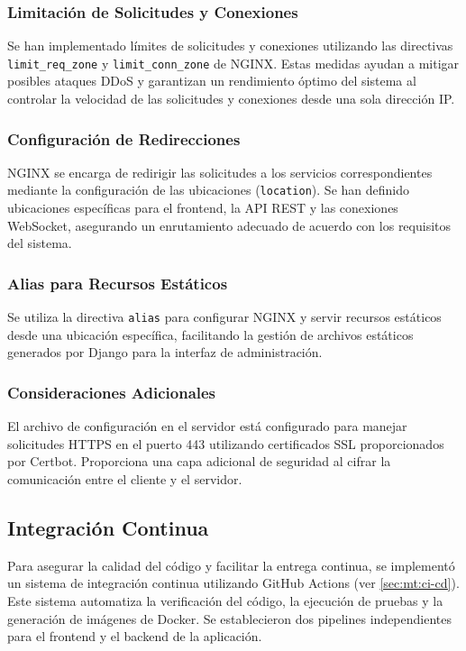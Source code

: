 \subsubsection{Limitación de Solicitudes y Conexiones}

Se han implementado límites de solicitudes y conexiones utilizando las directivas \texttt{limit\_req\_zone} y \texttt{limit\_conn\_zone} de NGINX. Estas medidas ayudan a mitigar posibles ataques DDoS y garantizan un rendimiento óptimo del sistema al controlar la velocidad de las solicitudes y conexiones desde una sola dirección IP.

\subsubsection{Configuración de Redirecciones}

NGINX se encarga de redirigir las solicitudes a los servicios correspondientes mediante la configuración de las ubicaciones (\texttt{location}). Se han definido ubicaciones específicas para el frontend, la API REST y las conexiones WebSocket, asegurando un enrutamiento adecuado de acuerdo con los requisitos del sistema.

\subsubsection{Alias para Recursos Estáticos}

Se utiliza la directiva \texttt{alias} para configurar NGINX y servir recursos estáticos desde una ubicación específica, facilitando la gestión de archivos estáticos generados por Django para la interfaz de administración.

\subsubsection{Consideraciones Adicionales}

 El archivo de configuración en el servidor está configurado para manejar solicitudes HTTPS en el puerto 443 utilizando certificados SSL proporcionados por Certbot. Proporciona una capa adicional de seguridad al cifrar la comunicación entre el cliente y el servidor.

\subsection{Integración Continua}
Para asegurar la calidad del código y facilitar la entrega continua, se implementó un sistema de integración continua utilizando GitHub Actions (ver \ref{sec:mt:ci-cd}). Este sistema automatiza la verificación del código, la ejecución de pruebas y la generación de imágenes de Docker. Se establecieron dos pipelines independientes para el frontend y el backend de la aplicación.

